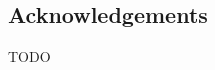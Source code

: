 \vspace*{\fill}
\begin{adjustwidth}{60pt}{60pt}
\begin{center}
\section*{Acknowledgements}
\normalsize
TODO
\end{center}
\end{adjustwidth}
\vspace*{\fill}
